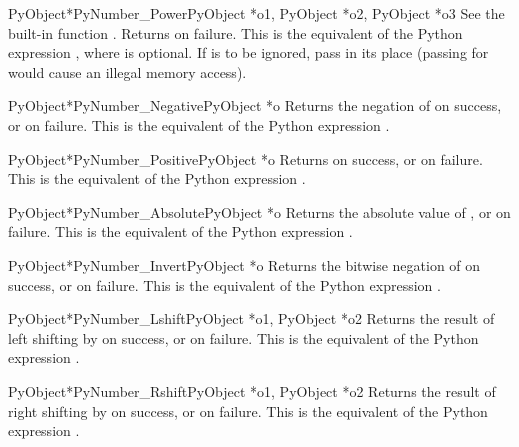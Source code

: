 \begin{cfuncdesc}{PyObject*}{PyNumber_Power}{PyObject *o1,
                                             PyObject *o2, PyObject *o3}
  See the built-in function .
  Returns \NULL{} on failure.  This is the equivalent of the Python
  expression , where 
  is optional.  If  is to be ignored, pass  in
  its place (passing \NULL{} for  would cause an illegal
  memory access).
\end{cfuncdesc}


\begin{cfuncdesc}{PyObject*}{PyNumber_Negative}{PyObject *o}
  Returns the negation of  on success, or \NULL{} on failure.
  This is the equivalent of the Python expression .
\end{cfuncdesc}


\begin{cfuncdesc}{PyObject*}{PyNumber_Positive}{PyObject *o}
  Returns  on success, or \NULL{} on failure.  This is the
  equivalent of the Python expression .
\end{cfuncdesc}


\begin{cfuncdesc}{PyObject*}{PyNumber_Absolute}{PyObject *o}
  Returns the absolute value of , or \NULL{} on failure.  This
  is the equivalent of the Python expression .
\end{cfuncdesc}


\begin{cfuncdesc}{PyObject*}{PyNumber_Invert}{PyObject *o}
  Returns the bitwise negation of  on success, or \NULL{} on
  failure.  This is the equivalent of the Python expression
  .
\end{cfuncdesc}


\begin{cfuncdesc}{PyObject*}{PyNumber_Lshift}{PyObject *o1, PyObject *o2}
  Returns the result of left shifting  by  on success,
  or \NULL{} on failure.  This is the equivalent of the Python
  expression .
\end{cfuncdesc}


\begin{cfuncdesc}{PyObject*}{PyNumber_Rshift}{PyObject *o1, PyObject *o2}
  Returns the result of right shifting  by  on
  success, or \NULL{} on failure.  This is the equivalent of the
  Python expression .
\end{cfuncdesc}


